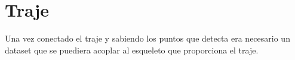 \section{Traje}
\label{sec:traje}

Una vez conectado el traje y sabiendo los puntos que detecta era necesario un dataset que se puediera acoplar al esqueleto que proporciona el traje.